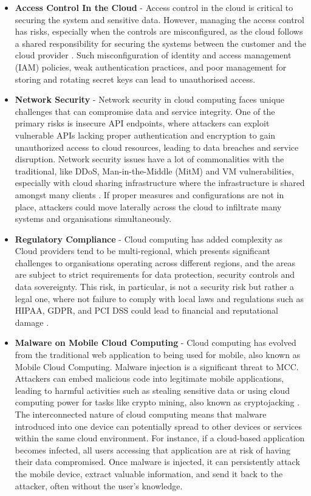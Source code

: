 \begin{itemize}
    \item \textbf{Access Control In the Cloud} - Access control in the cloud is critical to securing the system and sensitive data. However, managing the access control has risks, especially when the controls are misconfigured, as the cloud follows a shared responsibility for securing the systems between the customer and the cloud provider \citep{cloud_shared_resp}. Such misconfiguration of identity and access management (IAM) policies, weak authentication practices, and poor management for storing and rotating secret keys can lead to unauthorised access.  

    \item \textbf{Network Security } - Network security in cloud computing faces unique challenges that can compromise data and service integrity. One of the primary risks is insecure API endpoints, where attackers can exploit vulnerable APIs lacking proper authentication and encryption to gain unauthorized access to cloud resources, leading to data breaches and service disruption. Network security issues have a lot of commonalities with the traditional, like DDoS, Man-in-the-Middle (MitM)  and VM vulnerabilities, especially with cloud sharing infrastructure where the infrastructure is shared amongst many clients \citep{network_cloud}. If proper measures and configurations are not in place, attackers could move laterally across the cloud to infiltrate many systems and organisations simultaneously. 
    
    \item \textbf{Regulatory Compliance } - Cloud computing has added complexity as Cloud providers tend to be multi-regional, which presents significant challenges to organisations operating across different regions, and the areas are subject to strict requirements for data protection, security controls and data sovereignty. This risk, in particular, is not a security risk but rather a legal one, where not failure to comply with local laws and regulations such as HIPAA, GDPR, and PCI DSS could lead to financial and reputational damage \citep{legal_cloud_challenge}.
    
    \item \textbf{Malware on Mobile Cloud Computing } - Cloud computing has evolved from the traditional web application to being used for mobile, also known as Mobile Cloud Computing. Malware injection is a significant threat to MCC. Attackers can embed malicious code into legitimate mobile applications, leading to harmful activities such as stealing sensitive data or using cloud computing power for tasks like crypto mining, also known as cryptojacking \citep{cryptojacking}. The interconnected nature of cloud computing means that malware introduced into one device can potentially spread to other devices or services within the same cloud environment. For instance, if a cloud-based application becomes infected, all users accessing that application are at risk of having their data compromised. Once malware is injected, it can persistently attack the mobile device, extract valuable information, and send it back to the attacker, often without the user's knowledge.
    

\end{itemize}
